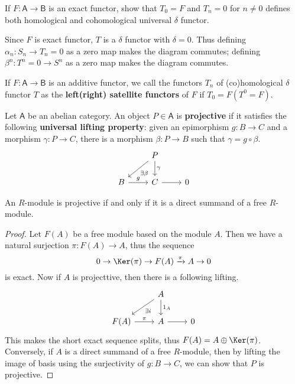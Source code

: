 \begin{exer} If $F:\mathsf{A}\rightarrow \mathsf{B}$ is an exact functor, show that $T_0=F$ and $T_n=0$ for $n\neq 0$ defines both homological and cohomological universal $\delta$ functor.
\end{exer}
\begin{solution} Since $F$ is exact functor, $T$ is a $\delta$ functor with $\delta=0$. Thus defining $\alpha_n:S_n\rightarrow T_n=0$ as a zero map makes the diagram commutes; defining $\beta^n:T^n=0\rightarrow S^n$ as a zero map makes the diagram commutes. 
\end{solution}

\begin{defn} If $F:\mathsf{A}\rightarrow \mathsf{B}$ is an additive functor, we call the functors $T_n$ of (co)homological $\delta$ functor $T$ as the \textbf{left(right) satellite functors} of $F$ if $T_0=F(T^0=F)$.
\end{defn}

\begin{defn} Let $\mathsf{A}$ be an abelian category. An object $P\in \mathsf{A}$ is \textbf{projective} if it satisfies the following \textbf{universal lifting property}: given an epimorphism $g:B\rightarrow C$ and a morphism $\gamma:P\rightarrow C$, there is a morphism $\beta:P\rightarrow B$ such that $\gamma=g\circ \beta$.
\begin{equation}
\begin{tikzcd}
&P\arrow{ld}{\exists \beta} \arrow{d}{\gamma}&\\
B\arrow{r}{g}&C\arrow[r]&0
\end{tikzcd}
\end{equation}
\end{defn}

\begin{prop} An $R$-module is projective if and only if it is a direct summand of a free $R$-module.
\end{prop}
\begin{proof}
Let $F(A)$ be a free module based on the module $A$. Then we have a natural surjection $\pi:F(A)\rightarrow A$, thus the sequence
\begin{equation}
0\rightarrow\Ker(\pi)\rightarrow F(A)\xrightarrow{\pi} A\rightarrow 0
\end{equation}
is exact. Now if $A$ is projecttive, then there is a following lifting.
\begin{equation}
\begin{tikzcd}
&A\arrow{ld}{\exists i} \arrow{d}{1_A}&\\
F(A)\arrow{r}{\pi}&A\arrow[r]&0
\end{tikzcd}
\end{equation}
This makes the short exact sequence splits, thus $F(A)=A\oplus \Ker(\pi)$. Conversely, if $A$ is a direct summand of a free $R$-module, then by lifting the image of basis using the surjectivity of $g:B\rightarrow C$, we can show that $P$ is projective.
\end{proof}

